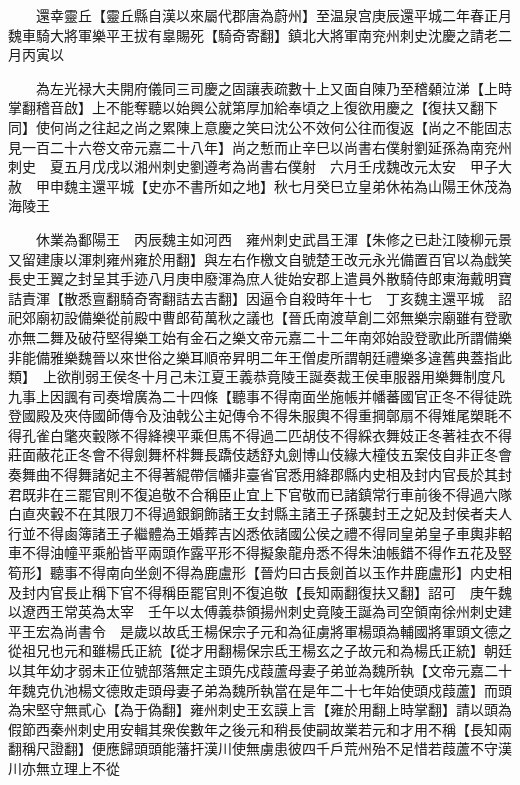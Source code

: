 　　還幸靈丘【靈丘縣自漢以來屬代郡唐為蔚州】至温泉宫庚辰還平城二年春正月魏車騎大將軍樂平王拔有辠賜死【騎奇寄翻】鎮北大將軍南兖州刺史沈慶之請老二月丙寅以

　　為左光禄大夫開府儀同三司慶之固讓表疏數十上又面自陳乃至稽顙泣涕【上時掌翻稽音啟】上不能奪聽以始興公就第厚加給奉頃之上復欲用慶之【復扶又翻下同】使何尚之往起之尚之累陳上意慶之笑曰沈公不效何公往而復返【尚之不能固志見一百二十六卷文帝元嘉二十八年】尚之慙而止辛巳以尚書右僕射劉延孫為南兖州刺史　夏五月戊戌以湘州刺史劉遵考為尚書右僕射　六月壬戌魏改元太安　甲子大赦　甲申魏主還平城【史亦不書所如之地】秋七月癸巳立皇弟休祐為山陽王休茂為海陵王

　　休業為鄱陽王　丙辰魏主如河西　雍州刺史武昌王渾【朱修之已赴江陵柳元景又留建康以渾刺雍州雍於用翻】與左右作檄文自號楚王改元永光備置百官以為戱笑長史王翼之封呈其手迹八月庚申廢渾為庶人徙始安郡上遣員外散騎侍郎東海戴明寶詰責渾【散悉亶翻騎奇寄翻詰去吉翻】因逼令自殺時年十七　丁亥魏主還平城　詔祀郊廟初設備樂從前殿中曹郎荀萬秋之議也【晉氏南渡草創二郊無樂宗廟雖有登歌亦無二舞及破苻堅得樂工始有金石之樂文帝元嘉二十二年南郊始設登歌此所謂備樂非能備雅樂魏晉以來世俗之樂耳順帝昇明二年王僧䖍所謂朝廷禮樂多違舊典蓋指此類】　上欲削弱王侯冬十月己未江夏王義恭竟陵王誕奏裁王侯車服器用樂舞制度凡九事上因諷有司奏增廣為二十四條【聽事不得南面坐施帳并幡蕃國官正冬不得徒跣登國殿及夾侍國師傳令及油戟公主妃傳令不得朱服輿不得重掆鄣扇不得雉尾槊毦不得孔雀白氅夾轂隊不得絳襖平乘但馬不得過二匹胡伎不得綵衣舞妓正冬著袿衣不得莊面蔽花正冬會不得劍舞杯柈舞長蹻伎䞬舒丸劍博山伎緣大橦伎五案伎自非正冬會奏舞曲不得舞諸妃主不得著緄帶信幡非臺省官悉用絳郡縣内史相及封内官長於其封君既非在三罷官則不復追敬不合稱臣止宜上下官敬而已諸鎮常行車前後不得過六隊白直夾轂不在其限刀不得過銀銅飾諸王女封縣主諸王子孫襲封王之妃及封侯者夫人行並不得鹵簿諸王子繼體為王婚葬吉凶悉依諸國公侯之禮不得同皇弟皇子車輿非軺車不得油幢平乘船皆平兩頭作露平形不得擬象龍舟悉不得朱油帳錯不得作五花及竪筍形】聽事不得南向坐劍不得為鹿盧形【晉灼曰古長劍首以玉作井鹿盧形】内史相及封内官長止稱下官不得稱臣罷官則不復追敬【長知兩翻復扶又翻】詔可　庚午魏以遼西王常英為太宰　壬午以太傅義恭領揚州刺史竟陵王誕為司空領南徐州刺史建平王宏為尚書令　是歲以故氐王楊保宗子元和為征虜將軍楊頭為輔國將軍頭文德之從祖兄也元和雖楊氏正統【從才用翻楊保宗氐王楊玄之子故元和為楊氏正統】朝廷以其年幼才弱未正位號部落無定主頭先戍葭蘆母妻子弟並為魏所執【文帝元嘉二十年魏克仇池楊文德敗走頭母妻子弟為魏所執當在是年二十七年始使頭戍葭蘆】而頭為宋堅守無貳心【為于偽翻】雍州刺史王玄謨上言【雍於用翻上時掌翻】請以頭為假節西秦州刺史用安輯其衆俟數年之後元和稍長使嗣故業若元和才用不稱【長知兩翻稱尺證翻】便應歸頭頭能藩扞漢川使無虜患彼四千戶荒州殆不足惜若葭蘆不守漢川亦無立理上不從

